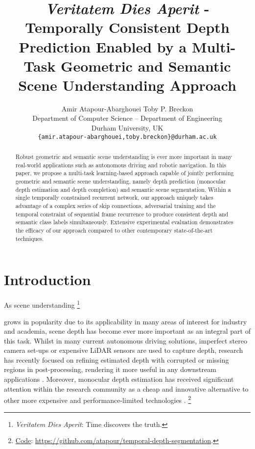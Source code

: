 \documentclass[10pt,twocolumn,letterpaper]{article}
\newcommand\blfootnote[1]{\begingroup
	\renewcommand\thefootnote{}\footnote{#1}\addtocounter{footnote}{-1}\endgroup
}
\begin{document}
\title{\textit{Veritatem Dies Aperit} - Temporally Consistent Depth Prediction Enabled by a Multi-Task Geometric and Semantic Scene Understanding Approach}

\author{Amir Atapour-Abarghouei \quad Toby P. Breckon\\
	Department of Computer Science -- Department of Engineering\\
	Durham University, UK\\
	{\tt\small \{amir.atapour-abarghouei,toby.breckon\}@durham.ac.uk}}

\maketitle
\thispagestyle{empty}

\begin{abstract}
   Robust geometric and semantic scene understanding is ever more important in many real-world applications such as autonomous driving and robotic navigation. In this paper, we propose a multi-task learning-based approach capable of jointly performing geometric and semantic scene understanding, namely depth prediction (monocular depth estimation and depth completion) and semantic scene segmentation. Within a single temporally constrained recurrent network, our approach uniquely takes advantage of a complex series of skip connections, adversarial training and the temporal constraint of sequential frame recurrence to produce consistent depth and semantic class labels simultaneously. Extensive experimental evaluation demonstrates the efficacy of our approach compared to other contemporary state-of-the-art techniques.\vspace{-0.50cm}\end{abstract}\vspace{-0.15cm}

\section{Introduction}
\label{sec:intro}\vspace{-0.1cm}

As scene understanding\blfootnote{\textit{Veritatem Dies Aperit}: Time discovers the truth.} grows in popularity due to its applicability in many areas of interest for industry and academia, scene depth has become ever more important as an integral part of this task. Whilst in many current autonomous driving solutions, imperfect stereo camera set-ups or expensive LiDAR sensors are used to capture depth, research has recently focused on refining estimated depth with corrupted or missing regions in post-processing, rendering it more useful in any downstream applications \cite{abarghouei18review, xue2017depth, zhang2018deep}. Moreover, monocular depth estimation has received significant attention within the research community as a cheap and innovative alternative to other more expensive and performance-limited technologies \cite{atapour2018real, eigen2015predicting, monodepth17, zhou2017unsupervised}.\blfootnote{\href{https://github.com/atapour/temporal-depth-segmentation}{Code}: \href{https://github.com/atapour/temporal-depth-segmentation}{https://github.com/atapour/temporal-depth-segmentation}.}
\end{document}
